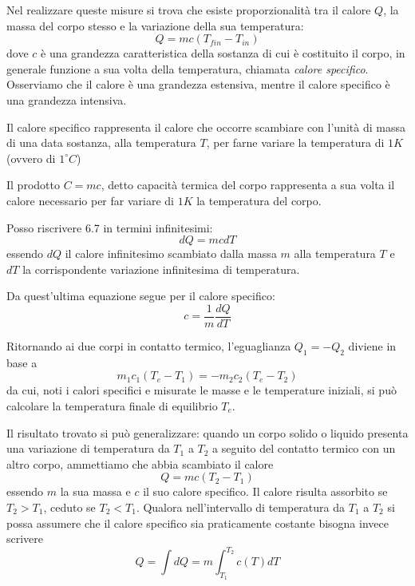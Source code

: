 \documentclass[class=book, crop=false, oneside, 12pt]{standalone}
\begin{document}
Nel realizzare queste misure si trova che esiste proporzionalità tra il calore \(Q\), la massa del corpo stesso e la variazione della sua temperatura:
\begin{equation}
    Q = m c \left(T_{fin} - T_{in}\right)
\end{equation} 
dove \(c\) è una grandezza caratteristica della sostanza di cui è costituito il corpo, in generale funzione a sua volta della temperatura, chiamata \emph{calore specifico}.
Osserviamo che il calore è una grandezza estensiva, mentre il calore specifico è una grandezza intensiva.

Il calore specifico rappresenta il calore che occorre scambiare con l'unità di massa di una data sostanza, alla temperatura \(T\), per farne variare la temperatura di \(1 K\) (ovvero di \(1 ^{\circ} C\))

Il prodotto \(C = mc\), detto capacità termica del corpo rappresenta a sua volta il calore necessario per far variare di \(1 K\) la temperatura del corpo.

Posso riscrivere 6.7 in termini infinitesimi:
\begin{equation}
    d Q = m c d T
\end{equation}
essendo \( d Q \) il calore infinitesimo scambiato dalla massa \(m\) alla temperatura \(T\) e \(d T\) la corrispondente variazione infinitesima di temperatura.

Da quest'ultima equazione segue per il calore specifico:
\begin{equation}
    c = \frac{1}{m} \frac{d Q}{d T}
\end{equation}

Ritornando ai due corpi in contatto termico, l'eguaglianza \(Q_1 = -Q_2\) diviene in base a 
\begin{equation*}
    m_1 c_1 (T_e - T_1) = - m_2 c_2 \left(T_e - T_2\right)
\end{equation*}
da cui, noti i calori specifici e misurate le masse e le temperature iniziali, si può calcolare la temperatura finale di equilibrio \(T_e\).

Il risultato trovato si può generalizzare: quando un corpo solido o liquido presenta una variazione di temperatura da \(T_1\) a \(T_2\) a seguito del contatto termico con un altro corpo, ammettiamo che abbia scambiato il calore
\begin{equation}
    Q = m c \left(T_2 - T_1\right)
\end{equation}
essendo \(m\) la sua massa e \(c\) il suo calore specifico. 
Il calore risulta assorbito se \(T_2 > T_1\), ceduto se \(T_2<T_1\). 
Qualora nell'intervallo di temperatura da \(T_1\) a \(T_2\) si possa assumere che il calore specifico sia praticamente costante bisogna invece scrivere
\begin{equation}
    Q = \int d Q = m \int_{T_1}^{T_2} c(T) d T
\end{equation} 
\end{document}
